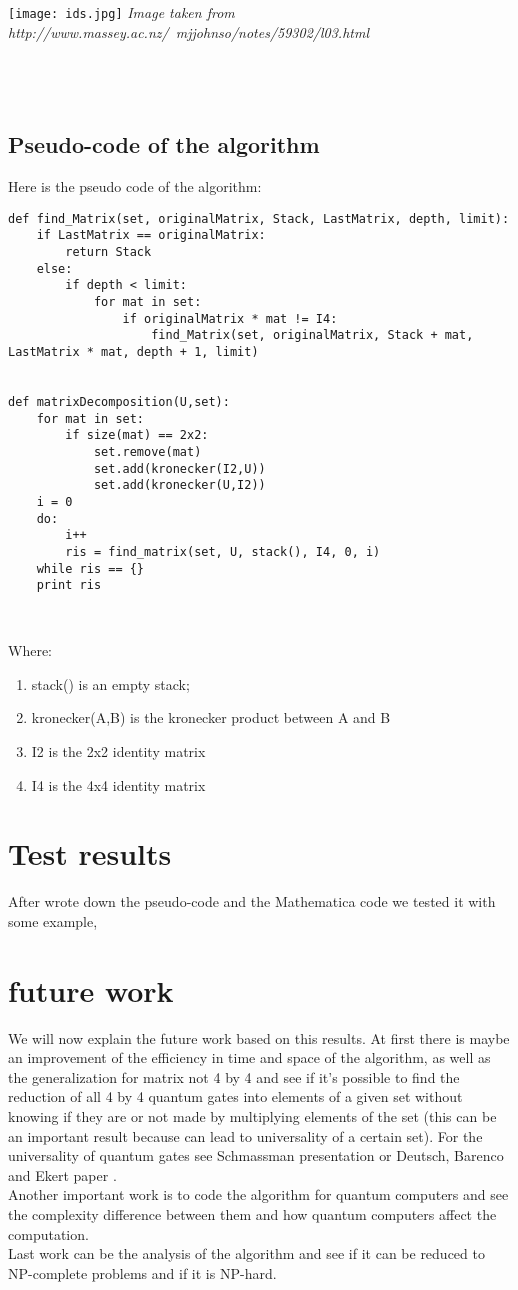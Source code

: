 \documentclass{amsart}
\begin{document}
\texttt{[image: ids.jpg]}
\textit{Image taken from http://www.massey.ac.nz/~mjjohnso/notes/59302/l03.html
}\\\\\\\\
\subsection{Pseudo-code of the algorithm}
Here is the pseudo code of the algorithm:
\begin{lstlisting}
def find_Matrix(set, originalMatrix, Stack, LastMatrix, depth, limit):
	if LastMatrix == originalMatrix:
		return Stack
	else:
		if depth < limit:
			for mat in set:
				if originalMatrix * mat != I4:
					find_Matrix(set, originalMatrix, Stack + mat, LastMatrix * mat, depth + 1, limit)
				
				
def matrixDecomposition(U,set):
	for mat in set:
		if size(mat) == 2x2:
			set.remove(mat)
			set.add(kronecker(I2,U))
			set.add(kronecker(U,I2))
	i = 0
	do:
		i++
		ris = find_matrix(set, U, stack(), I4, 0, i)
	while ris == {}
	print ris
	
	
\end{lstlisting}

Where:
\begin{enumerate}
\item stack() is an empty stack;
\item kronecker(A,B) is the kronecker product between A and B
\item I2 is the 2x2 identity matrix
\item I4 is the 4x4 identity matrix

\end{enumerate}

\section{Test results}
After wrote down the pseudo-code and the Mathematica code we tested it with some example, 


\section{future work}
We will now explain the future work based on this results. At first there is maybe an improvement of the efficiency in time and space of the algorithm, as well as the generalization for matrix not 4 by 4 and see if it's possible to find the reduction of all 4 by 4 quantum gates into elements of a given set without knowing if they are or not made by multiplying elements of the set (this can be an important result because can lead to universality of a certain set). For the universality of quantum gates see Schmassman presentation \cite{schmassman} or Deutsch, Barenco and Ekert paper \cite{DBA}.
\\Another important work is to code the algorithm for quantum computers and see the complexity difference between them and how quantum computers affect the computation.
\\Last work can be the analysis of the algorithm and see if it can be reduced to NP-complete problems and if it is NP-hard.
\end{document}

